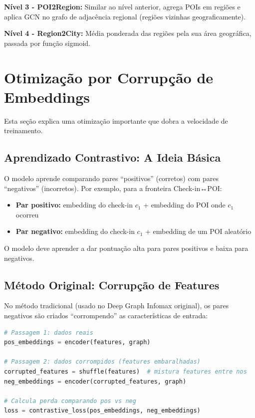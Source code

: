 \documentclass[a4paper,11pt]{article}
\begin{document}
\textbf{Nível 3 - POI2Region:} Similar ao nível anterior, agrega POIs em regiões e aplica GCN no grafo de adjacência regional (regiões vizinhas geograficamente).

\textbf{Nível 4 - Region2City:} Média ponderada das regiões pela sua área geográfica, passada por função sigmoid.

\newpage

\section{Otimização por Corrupção de Embeddings}

Esta seção explica uma otimização importante que dobra a velocidade de treinamento.

\subsection{Aprendizado Contrastivo: A Ideia Básica}

O modelo aprende comparando pares ``positivos'' (corretos) com pares ``negativos'' (incorretos). Por exemplo, para a fronteira Check-in↔POI:
\begin{itemize}
    \item \textbf{Par positivo:} embedding do check-in $c_1$ + embedding do POI onde $c_1$ ocorreu
    \item \textbf{Par negativo:} embedding do check-in $c_1$ + embedding de um POI aleatório
\end{itemize}

O modelo deve aprender a dar pontuação alta para pares positivos e baixa para negativos.

\subsection{Método Original: Corrupção de Features}

No método tradicional (usado no Deep Graph Infomax original), os pares negativos são criados ``corrompendo'' as características de entrada:

\begin{lstlisting}[language=Python, title={\textbf{Método Original (2 passagens pelo encoder)}}]
# Passagem 1: dados reais
pos_embeddings = encoder(features, graph)

# Passagem 2: dados corrompidos (features embaralhadas)
corrupted_features = shuffle(features)  # mistura features entre nos
neg_embeddings = encoder(corrupted_features, graph)

# Calcula perda comparando pos vs neg
loss = contrastive_loss(pos_embeddings, neg_embeddings)
\end{lstlisting}
\end{document}
